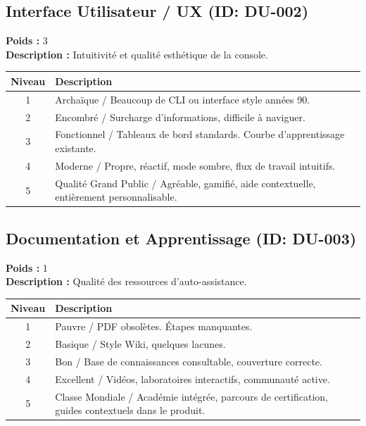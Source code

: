 \documentclass{article}
\begin{document}
\subsection{Interface Utilisateur / UX (ID: DU-002)}
\textbf{Poids :} 3 \\
\textbf{Description :} Intuitivité et qualité esthétique de la console.
\vspace{0.3cm}
\begin{longtable}{|c|p{12cm}|}
\hline
\rowcolor{lightgray} \textbf{Niveau} & \textbf{Description} \\ \hline
1 & Archaïque / Beaucoup de CLI ou interface style années 90. \\ \hline
2 & Encombré / Surcharge d'informations, difficile à naviguer. \\ \hline
3 & Fonctionnel / Tableaux de bord standards. Courbe d'apprentissage existante. \\ \hline
4 & Moderne / Propre, réactif, mode sombre, flux de travail intuitifs. \\ \hline
5 & Qualité Grand Public / Agréable, gamifié, aide contextuelle, entièrement personnalisable. \\ \hline
\end{longtable}
\vspace{0.5cm}
\subsection{Documentation et Apprentissage (ID: DU-003)}
\textbf{Poids :} 1 \\
\textbf{Description :} Qualité des ressources d'auto-assistance.
\vspace{0.3cm}
\begin{longtable}{|c|p{12cm}|}
\hline
\rowcolor{lightgray} \textbf{Niveau} & \textbf{Description} \\ \hline
1 & Pauvre / PDF obsolètes. Étapes manquantes. \\ \hline
2 & Basique / Style Wiki, quelques lacunes. \\ \hline
3 & Bon / Base de connaissances consultable, couverture correcte. \\ \hline
4 & Excellent / Vidéos, laboratoires interactifs, communauté active. \\ \hline
5 & Classe Mondiale / Académie intégrée, parcours de certification, guides contextuels dans le produit. \\ \hline
\end{longtable}
\vspace{0.5cm}
\end{document}
